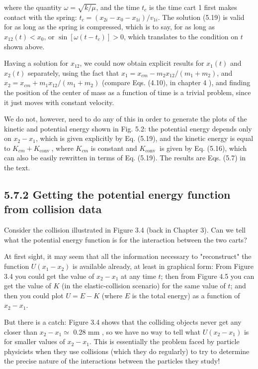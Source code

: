 \documentclass[10pt]{article}
\begin{document}
where the quantity $\omega=\sqrt{k / \mu}$, and the time $t_{c}$ is the time cart 1 first makes contact with the spring: $t_{c}=\left(x_{2 i}-x_{0}-x_{1 i}\right) / v_{1 i}$. The solution (5.19) is valid for as long as the spring is compressed, which is to say, for as long as $x_{12}(t)<x_{0}$, or $\sin \left[\omega\left(t-t_{c}\right)\right]>0$, which translates to the condition on $t$ shown above.

Having a solution for $x_{12}$, we could now obtain explicit results for $x_{1}(t)$ and $x_{2}(t)$ separately, using the fact that $x_{1}=x_{c m}-m_{2} x_{12} /\left(m_{1}+m_{2}\right)$, and $x_{2}=x_{c m}+m_{1} x_{12} /\left(m_{1}+m_{2}\right)$ (compare Eqs. (4.10), in chapter 4 ), and finding the position of the center of mass as a function of time is a trivial problem, since it just moves with constant velocity.

We do not, however, need to do any of this in order to generate the plots of the kinetic and potential energy shown in Fig. 5.2: the potential energy depends only on $x_{2}-x_{1}$, which is given explicitly by Eq. (5.19), and the kinetic energy is equal to $K_{c m}+K_{\text {conv }}$, where $K_{c m}$ is constant and $K_{\text {conv }}$ is given by Eq. (5.16), which can also be easily rewritten in terms of Eq. (5.19). The results are Eqs. (5.7) in the text.

\subsection*{5.7.2 Getting the potential energy function from collision data}
Consider the collision illustrated in Figure 3.4 (back in Chapter 3). Can we tell what the potential energy function is for the interaction between the two carts?

At first sight, it may seem that all the information necessary to "reconstruct" the function $U\left(x_{1}-x_{2}\right)$ is available already, at least in graphical form: From Figure 3.4 you could get the value of $x_{2}-x_{1}$ at any time $t$; then from Figure 4.5 you can get the value of $K$ (in the elastic-collision scenario) for the same value of $t$; and then you could plot $U=E-K$ (where $E$ is the total energy) as a function of $x_{2}-x_{1}$.

But there is a catch: Figure 3.4 shows that the colliding objects never get any closer than $x_{2}-x_{1} \simeq$ 0.28 mm , so we have no way to tell what $U\left(x_{2}-x_{1}\right)$ is for smaller values of $x_{2}-x_{1}$. This is essentially the problem faced by particle physicists when they use collisions (which they do regularly) to try to determine the precise nature of the interactions between the particles they study!
\end{document}
